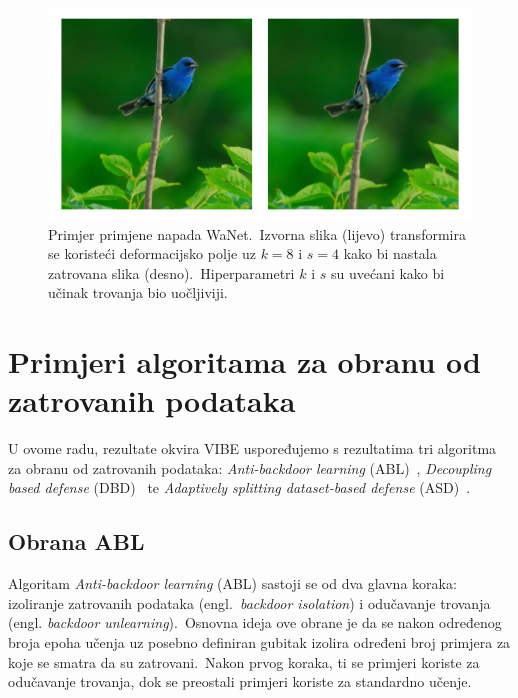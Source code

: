 \documentclass[diplomskirad]{fer}
\begin{document}
\begin{figure}[h]
  \centering
  \includegraphics[scale=0.6]{./Slike/imagenet1k_uzorak_wanet.png}
  \caption{Primjer primjene napada WaNet.\ Izvorna slika (lijevo) transformira se koristeći deformacijsko polje uz $k = 8$ i $s = 4$ kako bi nastala zatrovana slika (desno).\ Hiperparametri $k$ i $s$ su uvećani kako bi učinak trovanja bio uočljiviji.}
  \label{fig:wanet}
\end{figure}

\section{Primjeri algoritama za obranu od zatrovanih podataka}
\label{sek:primjeri_obrana_trovanje}

U ovome radu, rezultate okvira VIBE uspoređujemo s rezultatima tri algoritma za obranu od zatrovanih podataka: \textit{Anti-backdoor learning} (ABL)~\cite{li2021anti}, \textit{Decoupling based defense} (DBD)~\cite{huang2022backdoor} te \textit{Adaptively splitting dataset-based defense} (ASD)~\cite{gao2023backdoor}.\

\subsection{Obrana ABL}
\label{sub:abl}

Algoritam \textit{Anti-backdoor learning} (ABL) sastoji se od dva glavna koraka: izoliranje zatrovanih podataka (engl.\ \textit{backdoor isolation}) i odučavanje trovanja (engl. \textit{backdoor unlearning}).\ 
Osnovna ideja ove obrane je da se nakon određenog broja epoha učenja uz posebno definiran gubitak izolira određeni broj primjera za koje se smatra da su zatrovani.\  
Nakon prvog koraka, ti se primjeri koriste za odučavanje trovanja, dok se preostali primjeri koriste za standardno učenje.\ 
  
\end{document}
